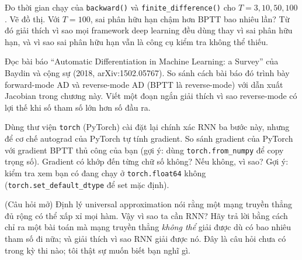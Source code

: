 \begin{bt}
  \item Đo thời gian chạy của \texttt{backward()} và
    \texttt{finite_difference()} cho $T = 3, 10, 50, 100$.
    Vẽ đồ thị. Với $T = 100$, sai phân hữu hạn chậm hơn BPTT bao nhiêu lần?
    Từ đó giải thích vì sao mọi framework deep learning đều dùng
     thay vì sai phân hữu hạn, và vì sao
    sai phân hữu hạn vẫn là công cụ
    kiểm tra không thể thiếu.

  \item Đọc bài báo ``Automatic Differentiation in Machine Learning: a
    Survey'' của Baydin và cộng sự (2018, arXiv:1502.05767). So sánh cách
    bài báo đó trình bày forward-mode AD và reverse-mode AD (BPTT là
    reverse-mode) với dẫn xuất Jacobian trong chương này. Viết một đoạn ngắn
    giải thích vì sao reverse-mode có lợi thế khi số tham số lớn hơn số đầu
    ra.

  \item Dùng thư viện \texttt{torch} (PyTorch) cài đặt lại chính
    xác RNN ba bước này, nhưng để cơ chế autograd của PyTorch tự tính
    gradient. So sánh gradient của PyTorch với gradient BPTT thủ công của bạn
    (gợi ý: dùng \texttt{torch.from_numpy} để copy trọng số).
    Gradient có khớp đến từng chữ số không? Nếu không, vì sao? Gợi ý: kiểm
    tra xem bạn có đang chạy ở \texttt{torch.float64} không
    (\texttt{torch.set_default_dtype} để set mặc định).

  \item (Câu hỏi mở) Định lý universal approximation nói rằng một mạng
    truyền thẳng đủ rộng có thể xấp xỉ mọi hàm. Vậy vì sao ta cần RNN? Hãy
    trả lời bằng cách chỉ ra một bài toán mà mạng truyền thẳng \emph{không
    thể} giải được dù có bao nhiêu tham số đi nữa; và giải thích vì sao RNN
    giải được nó. Đây là câu hỏi chưa có trong kỳ thi nào; tôi thật sự muốn
    biết bạn nghĩ gì.
\end{bt}

%
